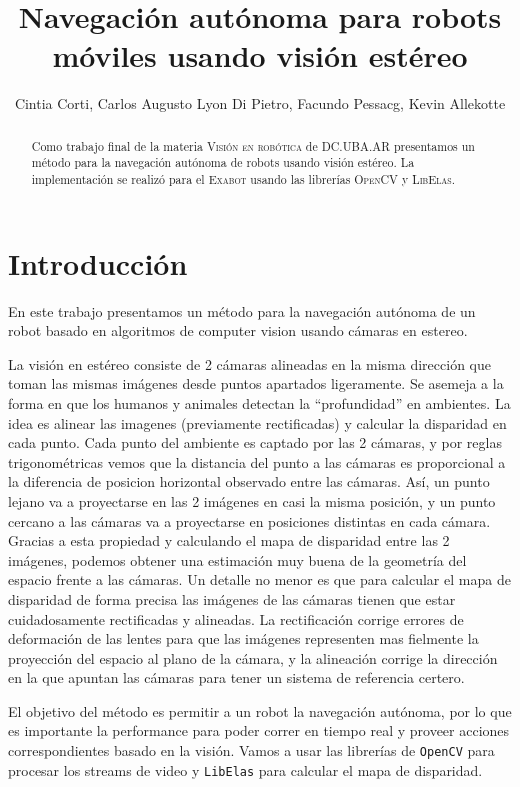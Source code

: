 \documentclass[journal,a4paper]{IEEEtran}
\begin{document}
\title{Navegación autónoma para robots móviles usando visión estéreo}
\author{Cintia Corti, Carlos Augusto Lyon Di Pietro, Facundo Pessacg, Kevin Allekotte}

\maketitle

\begin{abstract}
Como trabajo final de la materia \textsc{Visión en robótica} de \textsc{DC.UBA.AR}
presentamos un método para la navegación autónoma de robots usando visión estéreo.
La implementación se realizó para el \textsc{Exabot} usando las librerías \textsc{OpenCV} y \textsc{LibElas}.
\end{abstract}

\section{Introducción}
En este trabajo presentamos un método para la navegación autónoma de un robot basado en algoritmos de computer vision usando cámaras en estereo.

La visión en estéreo consiste de 2 cámaras alineadas en la misma dirección que toman las mismas imágenes desde puntos apartados ligeramente.
Se asemeja a la forma en que los humanos y animales detectan la ``profundidad'' en ambientes.
La idea es alinear las imagenes (previamente rectificadas) y calcular la disparidad en cada punto.
Cada punto del ambiente es captado por las 2 cámaras, y por reglas trigonométricas vemos que la distancia del punto a las cámaras es proporcional a la diferencia de posicion horizontal observado entre las cámaras.
Así, un punto lejano va a proyectarse en las 2 imágenes en casi la misma posición, y un punto cercano a las cámaras va a proyectarse en posiciones distintas en cada cámara. 
Gracias a esta propiedad y calculando el mapa de disparidad entre las 2 imágenes, podemos obtener una estimación muy buena de la geometría del espacio frente a las cámaras.
Un detalle no menor es que para calcular el mapa de disparidad de forma precisa las imágenes de las cámaras tienen que estar cuidadosamente rectificadas y alineadas. La rectificación corrige errores de deformación de las lentes para que las imágenes representen mas fielmente la proyección del espacio al plano de la cámara, y la alineación corrige la dirección en la que apuntan las cámaras para tener un sistema de referencia certero.

El objetivo del método es permitir a un robot la navegación autónoma, por lo que es importante la performance para poder correr en tiempo real y proveer acciones correspondientes basado en la visión. Vamos a usar las librerías de \texttt{OpenCV} para procesar los streams de video y \texttt{LibElas} para calcular el mapa de disparidad.
\end{document}

